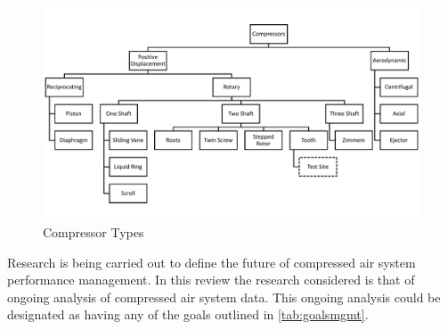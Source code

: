 \begin{figure}
\includegraphics[width = \textwidth]{./Images/CompressorClassification.pdf}
\caption{Compressor Types}
\label{fig:comptypes}
\end{figure}


Research is being carried out to define the future of compressed air system performance management. In this review the research considered is that of ongoing analysis of compressed air system data. This ongoing analysis could be designated as having any of the goals outlined in \autoref{tab:goalsmgmt}.

